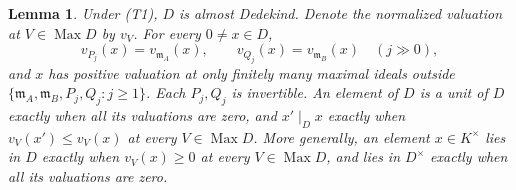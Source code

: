 \documentclass[11pt]{article}
\theoremstyle{plain}
\newtheorem{lemma}[theorem]{Lemma}
\theoremstyle{definition}
\theoremstyle{remark}
\DeclareMathOperator{\Max}{Max}
\newcommand{\EA}{\mathfrak m_A}
\newcommand{\EB}{\mathfrak m_B}
\begin{document}
\begin{lemma}\label{lem:geometry}
Under \textup{(T1)}, $D$ is almost Dedekind.  Denote the normalized
valuation at $V\in\Max D$ by $v_V$.  For every $0\ne x\in D$,
\begin{equation}\label{eq:tails}
 v_{P_j}(x)=v_{\EA}(x),\qquad v_{Q_j}(x)=v_{\EB}(x)
 \quad(j\gg0),
\end{equation}
and $x$ has positive valuation at only finitely many maximal ideals
outside $\{\EA,\EB,P_j,Q_j:j\geq1\}$.  Each $P_j,Q_j$ is invertible.  An
element of $D$ is a unit of $D$ exactly when all its valuations are zero,
and $x'\mid_Dx$ exactly when $v_V(x')\leq v_V(x)$ at every $V\in\Max D$.
More generally, an element $x\in K^\times$ lies in $D$ exactly when
$v_V(x)\geq0$ at every $V\in\Max D$, and lies in $D^\times$ exactly when
all its valuations are zero.
\end{lemma}
\end{document}
